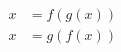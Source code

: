\documentclass[preview,varwidth ,multi]{standalone}
\begin{document}
\preview
$\begin{aligned}
x &= f(g(x))\\
x &= g(f(x))
\end{aligned}$
\endpreview
\end{document}
